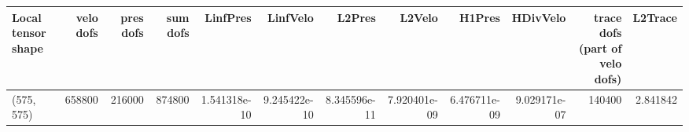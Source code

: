 \begin{tabular}{lrrrrrrrrrrr}
\toprule
Local tensor shape &  velo dofs &  pres dofs &  sum dofs &     LinfPres &     LinfVelo &       L2Pres &       L2Velo &       H1Pres &     HDivVelo &  trace dofs (part of velo dofs) &  L2Trace \\
\midrule
        (575, 575) &     658800 &     216000 &    874800 & 1.541318e-10 & 9.245422e-10 & 8.345596e-11 & 7.920401e-09 & 6.476711e-09 & 9.029171e-07 &                          140400 & 2.841842 \\
\bottomrule
\end{tabular}
